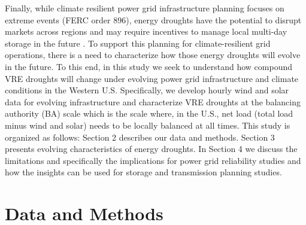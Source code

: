 \documentclass{agujournal2019}
\begin{document}
Finally, while climate resilient power grid infrastructure planning focuses on extreme events (FERC order 896), energy droughts have the potential to disrupt markets across regions \cite{Hill_2021} and may require incentives to manage local multi-day storage in the future \cite{Bracken2024}. To support this planning for climate-resilient grid operations, there is a need to characterize how those energy droughts will evolve in the future. To this end, in this study we seek to understand how compound VRE droughts will change under evolving power grid infrastructure and climate conditions in the Western U.S. Specifically, we develop hourly wind and solar data for evolving infrastructure and characterize VRE droughts at the balancing authority (BA) scale which is the scale where, in the U.S., net load (total load minus wind and solar) needs to be locally balanced at all times. This study is organized as follows: Section 2 describes our data and methods. Section 3 presents evolving characteristics of energy droughts. In Section 4 we discuss the limitations and specifically the implications for power grid reliability studies and how the insights can be used for storage and transmission planning studies. 

\section{Data and Methods}
\end{document}
